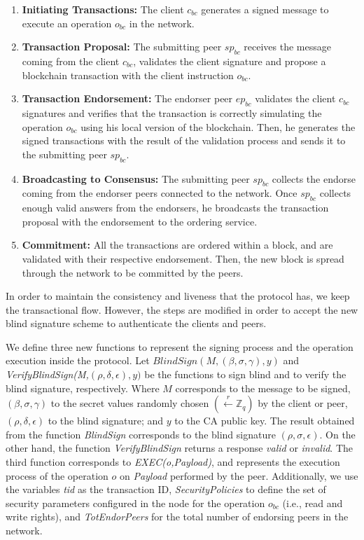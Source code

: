 \documentclass[conference]{IEEEtran}
\begin{document}
\begin{enumerate}
    \item \textbf{Initiating Transactions:} The client $c_{bc}$ generates a signed message to execute an operation $o_{bc}$ in the network.
    \item \textbf{Transaction Proposal:} The submitting peer $sp_{bc}$ receives the message coming from the client $c_{bc}$, validates the client signature and propose a blockchain transaction with the client instruction $o_{bc}$.
    \item \textbf{Transaction Endorsement:} The endorser peer $ep_{bc}$ validates the client $c_{bc}$ signatures and verifies that the transaction is correctly simulating the operation $o_{bc}$ using his local version of the blockchain. Then, he generates the signed transactions with the result of the validation process and sends it to the submitting peer $sp_{bc}$.
    \item \textbf{Broadcasting to Consensus:} The submitting peer $sp_{bc}$ collects the endorse coming from the endorser peers connected to the network. Once $sp_{bc}$ collects enough valid answers from the endorsers, he broadcasts the transaction proposal with the endorsement to the ordering service.
    \item \textbf{Commitment:} All the transactions are ordered within a block, and are validated with their respective endorsement. Then, the new block is spread through the network to be committed by the peers.
\end{enumerate}

In order to maintain the consistency and liveness that the protocol has, we keep the transactional flow. However, the steps are modified in order to accept the new blind signature scheme to authenticate the clients and peers.

We define three new functions to represent the signing process and the operation execution inside the protocol. Let $BlindSign(M,(\beta,\sigma,\gamma),y)$ and \textit{VerifyBlindSign(M,}$(\rho,\delta,\epsilon),y)$ be the functions to sign blind and to verify the blind signature, respectively. Where $M$ corresponds to the message to be signed, $(\beta,\sigma,\gamma)$ to the secret values randomly chosen $(\xleftarrow[]{r}\mathbb{Z}_q)$ by the client or peer, $(\rho,\delta,\epsilon)$ to the blind signature; and $y$ to the CA public key. The result obtained from the function \textit{BlindSign} corresponds to the blind signature $(\rho,\sigma,\epsilon)$. On the other hand, the function \textit{VerifyBlindSign} returns a response \textit{valid} or \textit{invalid}. The third function corresponds to \textit{EXEC(o,Payload)}, and represents the execution process of the operation $o$ on \textit{Payload} performed by the peer. Additionally, we use the variables \textit{tid} as the transaction ID, \textit{SecurityPolicies} to define the set of security parameters configured in the node for the operation $o_{bc}$ (i.e., read and write rights), and \textit{TotEndorPeers} for the total number of endorsing peers in the network.
\end{document}
